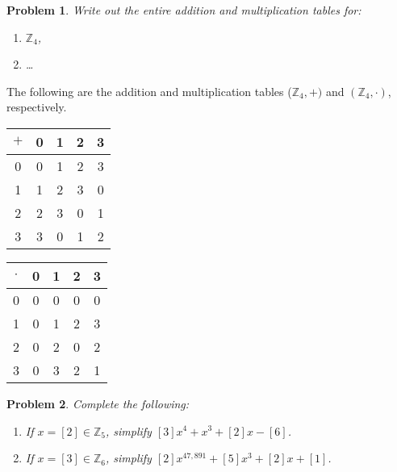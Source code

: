 \documentclass[12pt]{article}
\newtheorem{problem}{Problem}
\numberwithin{problem}{section} %
\theoremstyle{remark}  %
\newenvironment{answer}
    {\begin{adjustwidth}{0pt}{0pt}}
    {\end{adjustwidth}}
\begin{document}
    \begin{problem}
        Write out the entire addition and multiplication tables for:
        \begin{enumerate}[label=(\alph*)]
            \item $\mathbb{Z}_4$,
            \item \dots
        \end{enumerate}
    \end{problem}
    \begin{answer}
        The following are the addition and multiplication tables ($\mathbb{Z}_4, +)$ and $(\mathbb{Z}_4, \cdot)$, respectively. \\
        \begin{center}
            \begin{tabular}{c|cccc}
                $+$ & 0 & 1 & 2 & 3 \\
                \hline
                0 & 0 & 1 & 2 & 3 \\
                1 & 1 & 2 & 3 & 0 \\
                2 & 2 & 3 & 0 & 1 \\ 
                3 & 3 & 0 & 1 & 2
            \end{tabular}
            \hspace{5pt}
            \begin{tabular}{c|cccc}
                $\cdot$ & 0 & 1 & 2 & 3 \\
                \hline
                0 & 0 & 0 & 0 & 0 \\
                1 & 0 & 1 & 2 & 3 \\
                2 & 0 & 2 & 0 & 2 \\ 
                3 & 0 & 3 & 2 & 1
            \end{tabular}
        \end{center}
    \end{answer}
\vspace{5pt}
    \begin{problem}
        Complete the following:
        \begin{enumerate}[label=(\alph*)]
            \item If $x=[2]\in \mathbb{Z}_5$, simplify $[3]x^4+x^3+[2]x-[6]$.
            \item If $x=[3]\in\mathbb{Z}_6$, simplify $[2]x^{47,891} + [5]x^3 + [2]x + [1]$.
        \end{enumerate}
    \end{problem}
\end{document}
